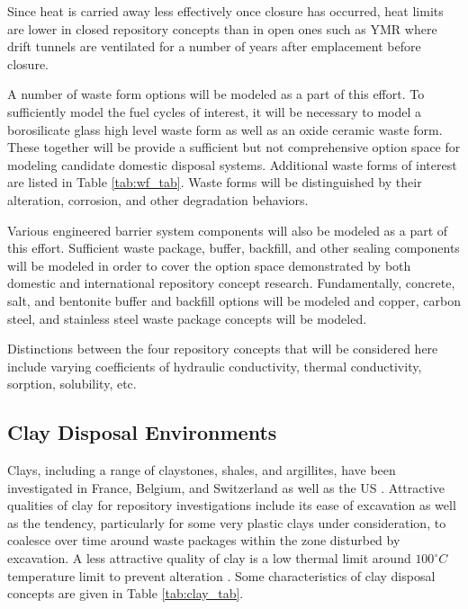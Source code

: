 Since heat is carried away less effectively once closure 
has occurred, heat limits are lower in  closed repository concepts than in open 
ones such as \gls{YMR} where drift tunnels are ventilated for a number of years
after emplacement before closure.

A number of waste form options will be modeled as a part of this effort. To 
sufficiently model the fuel cycles of interest, it will be necessary to model 
a borosilicate glass high level waste form as well as an oxide ceramic waste 
form. These together will be provide a sufficient but not comprehensive option 
space for modeling candidate domestic disposal systems. Additional waste forms 
of interest are listed in Table \ref{tab:wf_tab}. Waste forms will be 
distinguished by their alteration, corrosion, and other degradation behaviors.

Various engineered barrier system components will also be modeled as a part of 
this effort. Sufficient waste package, buffer, backfill, and other sealing 
components will be modeled in order to cover the option space demonstrated by 
both domestic and international repository concept research. Fundamentally, 
concrete, salt, and bentonite buffer and backfill options will be modeled and 
copper, carbon steel, and stainless steel waste package concepts will be 
modeled.

Distinctions between the four repository concepts that will be considered here 
include varying coefficients of hydraulic conductivity, thermal conductivity, 
sorption, solubility, etc.

\subsection{Clay Disposal Environments}

Clays, including a range of claystones, shales, and argillites, have been 
investigated in France, Belgium, and Switzerland as well as the  \gls{US} 
\cite{von_lensa_red-impact_2008, clayton_generic_2011}. Attractive qualities 
of clay for repository investigations include its ease of excavation as well as
the tendency, particularly for some very plastic clays under consideration, to 
coalesce over time around waste packages within the zone disturbed by 
excavation.  A less attractive quality of clay is a 
low thermal limit around $100^{\circ}C$ temperature limit to prevent alteration 
\cite{hardin_generic_2011}.
Some characteristics of clay disposal 
concepts are given in Table \ref{tab:clay_tab}.   

